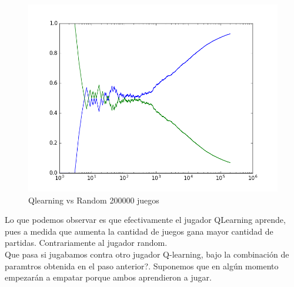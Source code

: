 \begin{figure}[h]
 \centering
  \begin{minipage}[c]{1\textwidth}
	\centering	
	\includegraphics[scale=0.5]{QlearningRandomEgreedy200000.png}
        \caption{Qlearning vs Random 200000 juegos}
  \end{minipage}
\end{figure}

Lo que podemos observar es que efectivamente el jugador QLearning aprende, pues a medida que aumenta la cantidad de juegos gana mayor cantidad de partidas. Contrariamente al jugador random.  \\

Que pasa si jugabamos contra otro jugador Q-learning, bajo la combinación de paramtros obtenida en el paso anterior?. Suponemos que en algún momento empezarán a empatar porque ambos aprendieron a jugar.\\

